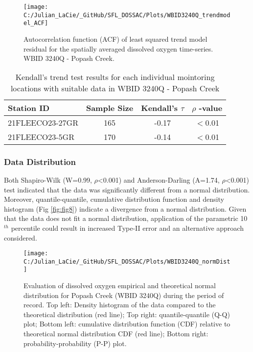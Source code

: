 \documentclass[]{interact}
\theoremstyle{plain}%
\theoremstyle{definition}
\theoremstyle{remark}
\begin{document}
\begin{figure}[H]

{\centering \texttt{[image: C:/Julian\_LaCie/\_GitHub/SFL\_DOSSAC/Plots/WBID3240Q\_trendmodel\_ACF]} 

}

\caption{\label{fig:fig7} Autocorrelation function (ACF) of least squared trend model residual for the spatially averaged dissolved oxygen time-series. WBID 3240Q - Popash Creek.}\label{fig:unnamed-chunk-11}
\end{figure}

\begin{table}[H]

\caption{\label{tab:unnamed-chunk-12}\label{tab:trendtab6} Kendall's trend test results for each individual mointoring locations with suitable data in WBID 3240Q - Popash Creek}
\centering
\fontsize{10}{12}\selectfont
\begin{tabular}[t]{lccc}
\toprule
Station ID & Sample Size & Kendall's $\tau$ & $\rho$ -value\\
\midrule
21FLEECO23-27GR & 165 & -0.17 & $<$0.01\\
21FLEECO23-5GR & 170 & -0.14 & $<$0.01\\
\bottomrule
\end{tabular}
\end{table}

\hypertarget{data-distribution-1}{%
\subsubsection{Data Distribution}\label{data-distribution-1}}

Both Shapiro-Wilk (W=0.99, \(\rho\)\textless0.001) and Anderson-Darling
(A=1.74, \(\rho\)\textless0.001) test indicated that the data was
significantly different from a normal distribution. Moreover,
quantile-quantile, cumulative distribution function and density
histogram (Fig \ref{fig:fig8}) indicate a divergence from a normal
distribution. Given that the data does not fit a normal distribution,
application of the parametric 10\(^{th}\) percentile could result in
increased Type-II error and an alternative approach considered.

\begin{figure}[H]

{\centering \texttt{[image: C:/Julian\_LaCie/\_GitHub/SFL\_DOSSAC/Plots/WBID3240Q\_normDist]} 

}

\caption{\label{fig:fig8} Evaluation of dissolved oxygen empirical and theoretical normal distribution for Popash Creek (WBID 3240Q) during the period of record. Top left: Density histogram of the data compared to the theoretical distribution (red line); Top right: quantile-quantile (Q-Q) plot; Bottom left: cumulative distribution function (CDF) relative to theoretical normal distribution CDF (red line); Bottom right: probability-probability (P-P) plot.}\label{fig:unnamed-chunk-13}
\end{figure}
\end{document}
